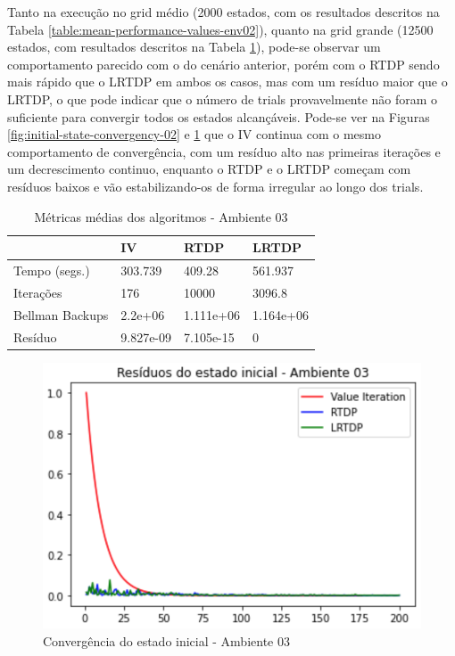 \documentclass[letterpaper]{article}
\begin{document}
Tanto na execução no grid médio (2000 estados, com os resultados descritos na Tabela \ref{table:mean-performance-values-env02}), quanto na grid grande (12500 estados, com resultados descritos na Tabela \ref{table:mean-performance-values-env03}), pode-se observar um comportamento parecido com o do cenário anterior, porém com o RTDP sendo mais rápido que o LRTDP em ambos os casos, mas com um resíduo maior que o LRTDP, o que pode indicar que o número de trials provavelmente não foram o suficiente para convergir todos os estados alcançáveis. Pode-se ver na Figuras \ref{fig:initial-state-convergency-02} e \ref{fig:initial-state-convergency-03} que o IV continua com o mesmo comportamento de convergência, com um resíduo alto nas primeiras iterações e um decrescimento continuo, enquanto o RTDP e o LRTDP começam com resíduos baixos e vão estabilizando-os de forma irregular ao longo dos trials.

\begin{table}[ht]
    \caption{Métricas médias dos algoritmos - Ambiente 03}
    \label{table:mean-performance-values-env03}
    \begin{tabular}{llll}
        \toprule
        {}              &        IV &      RTDP &     LRTDP \\
        \midrule
        Tempo (segs.)   &   303.739 &    409.28 &   561.937 \\
        Iterações       &       176 &     10000 &    3096.8 \\
        Bellman Backups &   2.2e+06 & 1.111e+06 & 1.164e+06 \\
        Resíduo         & 9.827e-09 & 7.105e-15 &         0 \\
        \bottomrule
    \end{tabular}
\end{table}

\begin{figure}[t]
    \centering
    \includegraphics[width=0.9\columnwidth]{initial-state-convergency-03}
    \caption{Convergência do estado inicial - Ambiente 03}
    \label{fig:initial-state-convergency-03}
\end{figure}
\end{document}
